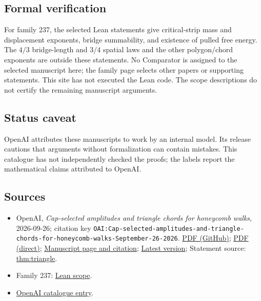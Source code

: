 \documentclass[11pt]{article}
\begin{document}
\subsection{Formal verification}
For family 237, the selected Lean statements give critical-strip mass and displacement exponents, bridge summability, and existence of pulled free energy. The $4/3$ bridge-length and $3/4$ spatial laws and the other polygon/chord exponents are outside these statements. No Comparator is assigned to the selected manuscript here; the family page selects other papers or supporting statements. This site has not executed the Lean code. The scope descriptions do not certify the remaining manuscript arguments.

\subsection{Status caveat}
OpenAI attributes these manuscripts to work by an internal model. Its release cautions that arguments without formalization can contain mistakes. This catalogue has not independently checked the proofs; the labels report the mathematical claims attributed to OpenAI.

\subsection{Sources}
\begin{itemize}
\item OpenAI, \emph{Cap-selected amplitudes and triangle chords for honeycomb walks}, 2026-09-26; citation key \texttt{OAI:Cap-selected-amplitudes-and-triangle-chords-for-honeycomb-walks-September-26-2026}. \href{https://github.com/openai/math/blob/adc7f1241b42e322a6451854ab7e4b4c146bf78a/preprints/Cap-selected-amplitudes-and-triangle-chords-for-honeycomb-walks-September-26-2026/main.pdf}{PDF (GitHub)}; \href{https://github.com/openai/math/raw/adc7f1241b42e322a6451854ab7e4b4c146bf78a/preprints/Cap-selected-amplitudes-and-triangle-chords-for-honeycomb-walks-September-26-2026/main.pdf}{PDF (direct)}; \href{https://github.com/openai/math/blob/adc7f1241b42e322a6451854ab7e4b4c146bf78a/preprints/Cap-selected-amplitudes-and-triangle-chords-for-honeycomb-walks-September-26-2026/README.md}{Manuscript page and citation}; \href{https://github.com/openai/math/blob/main/preprints/Cap-selected-amplitudes-and-triangle-chords-for-honeycomb-walks-September-26-2026/main.pdf}{Latest version}; Statement source: \href{https://github.com/openai/math/blob/adc7f1241b42e322a6451854ab7e4b4c146bf78a/preprints/Cap-selected-amplitudes-and-triangle-chords-for-honeycomb-walks-September-26-2026/build/sections/introduction.tex\#L21}{thm:triangle}.
\item Family 237: \href{https://github.com/openai/math/blob/adc7f1241b42e322a6451854ab7e4b4c146bf78a/lean/docs/237.md}{Lean scope}.
\item \href{https://github.com/openai/math/blob/adc7f1241b42e322a6451854ab7e4b4c146bf78a/CONTENTS.md}{OpenAI catalogue entry}.
\end{itemize}
\end{document}
